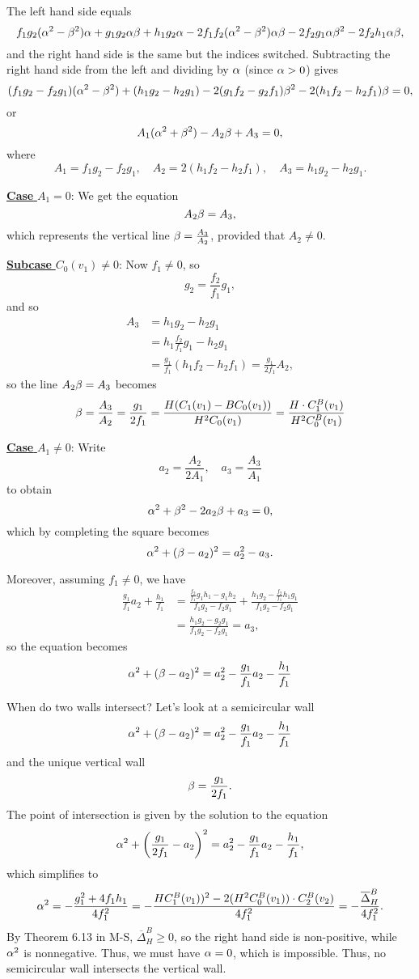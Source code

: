 \documentclass[letterpaper,10pt]{article}
\begin{document}
The left hand side equals
\[ f_1 g_2 (\alpha^2 - \beta^2) \alpha + g_1 g_2 \alpha \beta + h_1 g_2 \alpha - 2 f_1 f_2 (\alpha^2 - \beta^2) \alpha \beta - 2 f_2 g_1 \alpha \beta^2 - 2 f_2 h_1 \alpha \beta, \]
and the right hand side is the same but the indices switched. Subtracting the right hand side from the left and dividing by $\alpha$ (since $\alpha > 0$) gives
\[ (f_1 g_2 - f_2 g_1) (\alpha^2 - \beta^2) + (h_1 g_2 - h_2 g_1) - 2(g_1 f_2 - g_2 f_1) \beta^2 - 2(h_1 f_2 - h_2 f_1) \beta = 0, \]
or 
\[ A_1 (\alpha^2 + \beta^2) - A_2 \beta + A_3 = 0, \]
where
\[ A_1 = f_1 g_2 - f_2 g_1, \quad A_2 = 2(h_1 f_2 - h_2 f_1), \quad A_3 = h_1 g_2 - h_2 g_1. \]

\noindent\underline{{\bf Case} $A_1 = 0$}:
We get the equation
\[ A_2 \beta = A_3, \]
which represents the vertical line $\beta = \frac{A_3}{A_2}$, provided that $A_2 \neq 0$.

\noindent\underline{{\bf Subcase} $C_0(v_1) \neq 0$}: Now $f_1 \neq 0$, so
\[ g_2 = \frac{f_2}{f_1} g_1, \]
and so
\begin{align*}
    A_3 & = h_1 g_2 - h_2 g_1 \\
    & = h_1 \frac{f_2}{f_1} g_1 - h_2 g_1 \\
    & = \frac{g_1}{f_1} (h_1 f_2 - h_2 f_1) = \frac{g_1}{2 f_1} A_2,
\end{align*}
so the line $A_2 \beta = A_3$ becomes
\[ \beta = \frac{A_3}{A_2} = \frac{g_1}{2 f_1} = \frac{H (C_1(v_1) - B C_0(v_1))}{H^2 C_0(v_1)} = \frac{H \cdot C_1^B(v_1)}{H^2 C_0^B(v_1)} \]

\noindent\underline{{\bf Case} $A_1 \neq 0$}: Write
\[ a_2 = \frac{A_2}{2 A_1}, \quad a_3 = \frac{A_3}{A_1} \]
to obtain
\[ \alpha^2 + \beta^2 - 2 a_2 \beta + a_3 = 0, \]
which by completing the square becomes
\[ \alpha^2 + (\beta - a_2)^2 = a_2^2 - a_3. \]

Moreover, assuming $f_1 \neq 0$, we have
\begin{align*}
    \frac{g_1}{f_1} a_2 + \frac{h_1}{f_1} & = \frac{\frac{f_2}{f_1} g_1 h_1 - g_1 h_2}{f_1 g_2 - f_2 g_1} + \frac{h_1 g_2 - \frac{f_2}{f_1} h_1 g_1}{f_1 g_2 - f_2 g_1} \\
    & = \frac{h_1 g_2 - g_2 g_1}{f_1 g_2 - f_2 g_1} = a_3,
\end{align*}
so the equation becomes
\[ \alpha^2 + (\beta - a_2)^2 = a_2^2 - \frac{g_1}{f_1} a_2 - \frac{h_1}{f_1} \]

When do two walls intersect? Let's look at a semicircular wall
\[ \alpha^2 + (\beta - a_2)^2 = a_2^2 - \frac{g_1}{f_1} a_2 - \frac{h_1}{f_1} \]
and the unique vertical wall
\[ \beta = \frac{g_1}{2 f_1}. \]
The point of intersection is given by the solution to the equation
\[ \alpha^2 + \left(\frac{g_1}{2 f_1} - a_2\right)^2 = a_2^2 - \frac{g_1}{f_1} a_2 - \frac{h_1}{f_1}, \]
which simplifies to
\[ \alpha^2 = -\frac{g_1^2 + 4 f_1 h_1}{4 f_1^2} = - \frac{H C_1^B(v_1))^2 - 2 (H^2 C_0^B(v_1))\cdot C_2^B(v_2)}{4 f_1^2} = -\frac{\overline{\Delta}^B_H}{4 f_1^2}. \]
By Theorem 6.13 in M-S, $\overline{\Delta}^B_H \ge 0$, so the right hand side is non-positive, while $\alpha^2$ is nonnegative. Thus, we must have $\alpha = 0$, which is impossible. Thus, no semicircular wall intersects the vertical wall.
\end{document}
